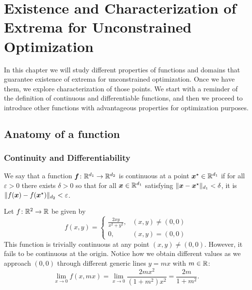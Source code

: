 
\chapter[Unconstrained Optimization]{Existence and Characterization of Extrema for Unconstrained Optimization}\label{chapter:UnconstrainedExistenceCharacterization}

In this chapter we will study different properties of functions and domains that guarantee existence of extrema for unconstrained optimization. Once we have them, we explore characterization of those points.  We start with a reminder of the definition of continuous and differentiable functions, and then we proceed to introduce other functions with advantageous properties for optimization purposes.

\section{Anatomy of a function}

\subsection{Continuity and Differentiability}

\begin{definition}\label{def:continuous}
We say that a function $\boldsymbol{f} \colon \mathbb{R}^{d_1} \to \mathbb{R}^{d_2}$ is continuous at a point $\boldsymbol{x}^{\star} \in \mathbb{R}^{d_1}$ if for all $\varepsilon > 0$ there exists $\delta > 0$ so that for all $\boldsymbol{x} \in \mathbb{R}^{d_1}$ satisfying $\lVert \boldsymbol{x}-\boldsymbol{x}^{\star} \rVert_{d_1}<\delta$, it is $\lVert  f(\boldsymbol{x}) - f(\boldsymbol{x}^{\star})  \rVert_{d_2} < \varepsilon$.  
\end{definition}

\begin{example}
Let $f\colon \mathbb{R}^2 \to \mathbb{R}$ be given by
\begin{equation*}
f(x,y) = \begin{cases}
\frac{2xy}{x^2+y^2}, &(x,y) \neq (0,0) \\
0, &(x,y)=(0,0)
\end{cases}
\end{equation*}
This function is trivially continuous at any point $(x,y)\neq(0,0)$.  However, it fails to be continuous at the origin.  Notice how we obtain different values as we approach $(0,0)$ through different generic lines $y=mx$ with $m \in \mathbb{R}$:
\begin{equation*}
\lim_{x\to 0} f(x,mx) = \lim_{x \to 0} \frac{2mx^2}{(1+m^2)x^2} = \frac{2m}{1+m^2}.
\end{equation*}
\end{example}

